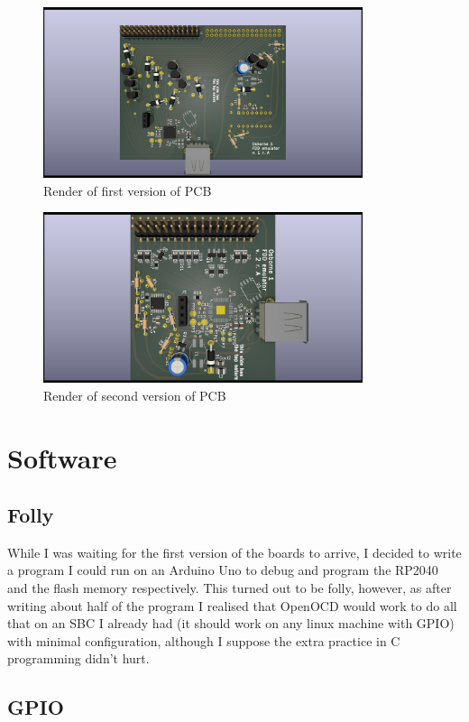 \documentclass[a4paper]{article}
\begin{document}
\begin{figure}
  \centering
  \includegraphics[height=5cm]{pcb-v1}
  \caption{Render of first version of PCB}
\end{figure}

\begin{figure}
  \centering
  \includegraphics[height=5cm]{pcb-v2}
  \caption{Render of second version of PCB}
\end{figure}

\section{Software}

\subsection{Folly}

While I was waiting for the first version of the boards to arrive, I
decided to write a program I could run on an Arduino Uno to debug and
program the RP2040 and the flash memory respectively. This turned out
to be folly, however, as after writing about half of the program I
realised that OpenOCD would work to do all that on an SBC I already
had (it should work on any linux machine with GPIO) with minimal
configuration, although I suppose the extra practice in C programming
didn't hurt.

\subsection{GPIO}
\end{document}
